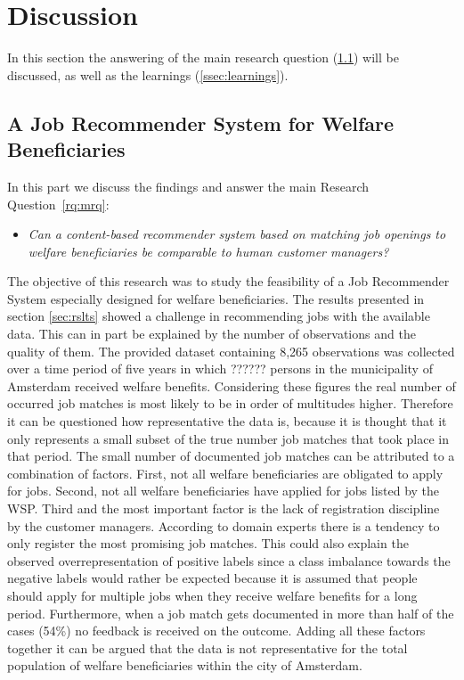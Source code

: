 \section{Discussion}
\label{sec:disc}


In this section the answering of the main research question (\ref{ssec:jrswb}) will be discussed, as well as the learnings (\ref{ssec:learnings}).

\subsection{A Job Recommender System for Welfare Beneficiaries}
\label{ssec:jrswb}

In this part we discuss the findings and answer the main Research Question~\ref{rq:mrq}: 
\begin{itemize}
	\item[] \em Can a content-based recommender system based on matching job openings to welfare beneficiaries be comparable to human customer managers?
\end{itemize}

\noindent The objective of this research was to study the feasibility of a Job Recommender System especially designed for welfare beneficiaries. 
The results presented in section \ref{sec:rslts} showed a challenge in recommending jobs with the available data.
This can in part be explained by the number of observations and the quality of them.
The provided dataset containing 8,265 observations was collected over a time period of five years in which ?????? persons in the municipality of Amsterdam received welfare benefits. %
Considering these figures the real number of occurred job matches is most likely to be in order of multitudes higher.
Therefore it can be questioned how representative the data is, because it is thought that it only represents  a small subset of the true number job matches that took place in that period.  
The small number of documented job matches can be attributed to a combination of factors.
First, not all welfare beneficiaries are obligated to apply for jobs.
Second, not all welfare beneficiaries have applied for jobs listed by the WSP.
Third and the most important factor is the lack of registration discipline by the customer managers.
According to domain experts there is a tendency to only register the most promising job matches.
This could also explain the observed overrepresentation of positive labels since a class imbalance towards the negative labels would rather be expected because it is assumed that people should apply for multiple jobs when they receive welfare benefits for a long period. 
Furthermore, when a job match gets documented in more than half of the cases (54\%) no feedback is received on the outcome.
Adding all these factors together it can be argued that the data is not representative for the total population of welfare beneficiaries within the city of Amsterdam. 

